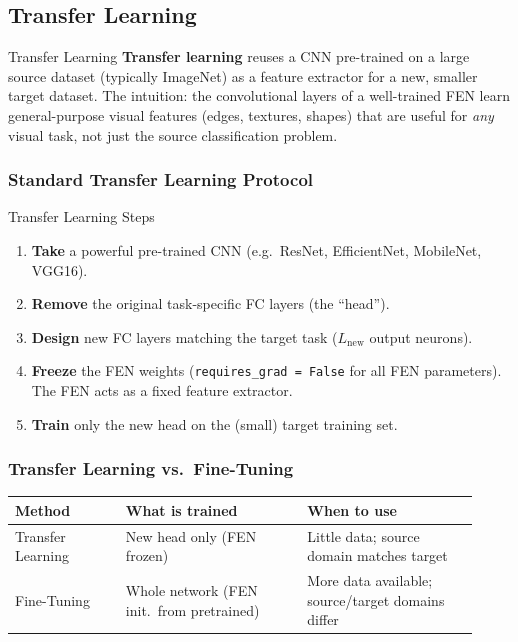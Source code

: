 \documentclass[11pt,a4paper]{article}
\newcommand{\term}[1]{\textcolor{DefGreen}{\textbf{#1}}}
\begin{document}
\subsection{Transfer Learning}
\label{sec:transfer_learning}

\begin{defbox}{Transfer Learning}
\term{Transfer learning} reuses a CNN pre-trained on a large source dataset (typically ImageNet) as a feature extractor for a new, smaller target dataset. The intuition: the convolutional layers of a well-trained FEN learn general-purpose visual features (edges, textures, shapes) that are useful for \emph{any} visual task, not just the source classification problem.
\end{defbox}

\subsubsection{Standard Transfer Learning Protocol}

\begin{algobox}{Transfer Learning Steps}
\begin{enumerate}
  \item \textbf{Take} a powerful pre-trained CNN (e.g.\ ResNet, EfficientNet, MobileNet, VGG16).
  \item \textbf{Remove} the original task-specific FC layers (the ``head'').
  \item \textbf{Design} new FC layers matching the target task ($L_{\text{new}}$ output neurons).
  \item \textbf{Freeze} the FEN weights (\texttt{requires\_grad = False} for all FEN parameters). The FEN acts as a fixed feature extractor.
  \item \textbf{Train} only the new head on the (small) target training set.
\end{enumerate}
\end{algobox}

\subsubsection{Transfer Learning vs.\ Fine-Tuning}

\begin{tcolorbox}[colback=LightBlue,colframe=AccentBlue,boxrule=0.8pt,arc=3pt]
\begin{tabular}{@{}p{0.22\linewidth}p{0.36\linewidth}p{0.34\linewidth}@{}}
\toprule
\textbf{Method} & \textbf{What is trained} & \textbf{When to use} \\
\midrule
Transfer Learning & New head only (FEN frozen) & Little data; source domain matches target \\
Fine-Tuning & Whole network (FEN init.\ from pretrained) & More data available; source/target domains differ \\
\bottomrule
\end{tabular}
\end{tcolorbox}
\end{document}
